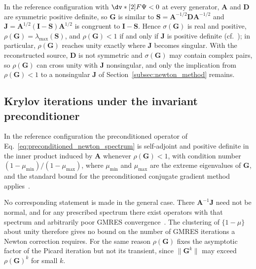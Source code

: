 In the reference configuration with $\dv*[2]{F}{\Psi}<0$ at every generator, $\mathbf{A}$ and $\mathbf{D}$ are symmetric positive definite, so $\mathbf{G}$ is similar to $\mathbf{S}=\mathbf{A}^{-1/2}\mathbf{D}\mathbf{A}^{-1/2}$ and $\mathbf{J}=\mathbf{A}^{1/2}(\mathbf{I}-\mathbf{S})\mathbf{A}^{1/2}$ is congruent to $\mathbf{I}-\mathbf{S}$. Hence $\sigma(\mathbf{G})$ is real and positive, $\rho(\mathbf{G})=\lambda_{\max}(\mathbf{S})$, and $\rho(\mathbf{G})<1$ if and only if $\mathbf{J}$ is positive definite (cf.~\cite{Householder1964TheAnalysis,Ortega2000IterativeVariables}); in particular, $\rho(\mathbf{G})$ reaches unity exactly where $\mathbf{J}$ becomes singular. With the reconstructed source, $\mathbf{D}$ is not symmetric and $\sigma(\mathbf{G})$ may contain complex pairs, so $\rho(\mathbf{G})$ can cross unity with $\mathbf{J}$ nonsingular, and only the implication from $\rho(\mathbf{G})<1$ to a nonsingular $\mathbf{J}$ of Section~\ref{subsec:newton_method} remains.

\subsection{Krylov iterations under the invariant preconditioner}
\label{subsec:krylov}

In the reference configuration the preconditioned operator of Eq.~\eqref{eq:preconditioned_newton_spectrum} is self-adjoint and positive definite in the inner product induced by $\mathbf{A}$ whenever $\rho(\mathbf{G})<1$, with condition number $(1-\mu_{\min})/(1-\mu_{\max})$, where $\mu_{\min}$ and $\mu_{\max}$ are the extreme eigenvalues of $\mathbf{G}$, and the standard bound for the preconditioned conjugate gradient method applies~\cite{Saad2003IterativeSystems}.

No corresponding statement is made in the general case. There $\mathbf{A}^{-1}\mathbf{J}$ need not be normal, and for any prescribed spectrum there exist operators with that spectrum and arbitrarily poor GMRES convergence~\cite{Greenbaum1996AnyGMRES}. The clustering of $\{1-\mu\}$ about unity therefore gives no bound on the number of GMRES iterations a Newton correction requires. For the same reason $\rho(\mathbf{G})$ fixes the asymptotic factor of the Picard iteration but not its transient, since $\|\mathbf{G}^{k}\|$ may exceed $\rho(\mathbf{G})^{k}$ for small $k$.